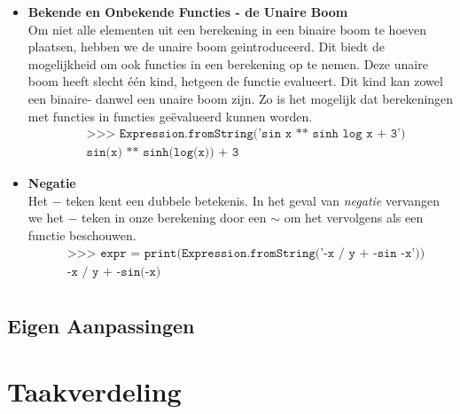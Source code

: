 \documentclass[12pt]{article}
\begin{document}
\begin{itemize}
\item \textbf{Bekende en Onbekende Functies - de Unaire Boom} \\
Om niet alle elementen uit een berekening in een binaire boom te hoeven plaatsen, hebben we de unaire boom geintroduceerd. Dit biedt de mogelijkheid om ook functies in een berekening op te nemen. Deze unaire boom heeft slecht \'e\'en kind, hetgeen de functie evalueert. Dit kind kan zowel een binaire- danwel een unaire boom zijn. Zo is het mogelijk dat berekeningen met functies in functies ge\"evalueerd kunnen worden.
\begin{align*}
&\texttt{>>> Expression.fromString('sin x ** sinh log x + 3')}\\
&\texttt{sin(x) ** sinh(log(x)) + 3}
\end{align*}

\item \textbf{Negatie} \\
Het $-$ teken kent een dubbele betekenis. In het geval van \textit{negatie} vervangen we het $-$ teken in onze berekening door een $\sim$ om het vervolgens als een functie beschouwen. 
\begin{align*}
&\texttt{>>> expr =  print(Expression.fromString('-x / y + -sin -x'))}\\
&\texttt{-x / y + -sin(-x)}\\
\end{align*}

\end{itemize}

\subsection*{Eigen Aanpassingen}


\newpage
\section{Taakverdeling}
\end{document}
